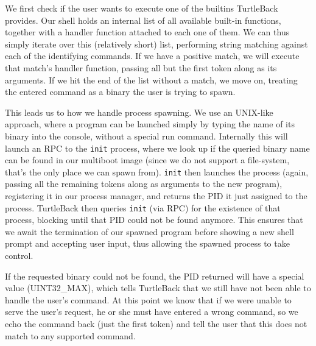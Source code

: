 We first check if the user wants to execute one of the builtins TurtleBack 
provides. Our shell holds an internal list of all available built-in functions, 
together with a handler function attached to each one of them. We can thus 
simply iterate over this (relatively short) list, performing string matching 
against each of the identifying commands.
If we have a positive match, we will execute that match's handler function, 
passing all but the first token along as its arguments.
If we hit the end of the list without a match, we move on, treating the entered 
command as a binary the user is trying to spawn.
\medskip

This leads us to how we handle process spawning. We use an UNIX-like approach, 
where a program can be launched simply by typing the name of its binary into 
the console, without a special run command. Internally this will launch an RPC 
to the \texttt{init} process, where we look up if the queried binary name can 
be found in our multiboot image (since we do not support a file-system, that's 
the only place we can spawn from). \texttt{init} then launches the process 
(again, passing all the remaining tokens along as arguments to the new 
program), registering it in our process manager, and returns the PID it just 
assigned to the process. TurtleBack then queries \texttt{init} (via RPC) for 
the existence of that process, blocking until that PID could not be found 
anymore. This ensures that we await the termination of our spawned program 
before showing a new shell prompt and accepting user input, thus allowing the 
spawned process to take control.
\medskip

If the requested binary could not be found, the PID returned will have a 
special value (UINT32\_MAX), which tells TurtleBack that we still have not been 
able to handle the user's command. At this point we know that if we were unable 
to serve the user's request, he or she must have entered a wrong command, so we 
echo the command back (just the first token) and tell the user that this does 
not match to any supported command.